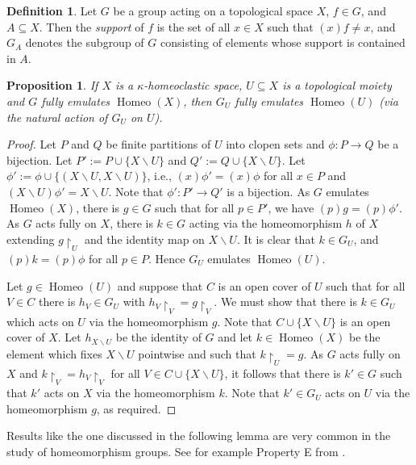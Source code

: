 \documentclass[11pt]{amsart}
\newtheorem{proposition}[theorem]{Proposition}
\theoremstyle{definition}
\newtheorem{definition}[theorem]{Definition}
\newcommand{\Homeo}{\operatorname{Homeo}}
\begin{document}
\begin{definition}\label{def:supdef}
    Let \(G\) be a group acting on a topological space \(X\), $f\in G$, and \(A\subseteq X\). Then the {\em support} of $f$ is the set of all $x\in X$ such that $(x)f\neq x$, and 
    $G_A$ denotes the subgroup of $G$ consisting of elements whose support is contained in \(A\). 
\end{definition}
\begin{proposition}\label{marvelous-stabilisers}
    If \(X\) is a \(\kappa\)-homeoclastic space, \(U\subseteq X\) is a topological moiety and \(G\) fully emulates \(\Homeo(X)\), then \(G_U\) fully emulates \(\Homeo(U)\) (via the natural action of \(G_U\) on \(U\)).
\end{proposition}
    \begin{proof}
        Let \(P\) and \(Q\) be finite partitions of \(U\) into clopen sets and \(\phi:P\to Q\) be a bijection.
        Let \(P':=P\cup \{X\backslash U\}\) and \(Q':=Q\cup \{X\backslash U\}\). Let \(\phi':=\phi \cup \{(X\backslash U,X\backslash U)\} \), i.e., $(x)\phi'=(x)\phi$ for all $x\in P$ and $(X\backslash U)\phi'=X\backslash U$.
        Note that \(\phi':P'\to Q'\) is a bijection.
As \(G\) emulates \(\Homeo(X)\), there is \(g\in G\) such that for all \(p\in P'\), we have \((p)g=(p)\phi'\).
As \(G\) acts fully on \(X\), there is \(k\in G\) acting via the homeomorphism \(h\) of \(X\) extending \(g{\restriction}_U\) and the identity map on \(X\backslash U\). It is clear that \(k\in G_U\), and $(p)k=(p)\phi$ for all $p\in P$. Hence $G_U$ emulates $\Homeo(U)$.

Let \(g\in \Homeo(U)\) and suppose that \(C\) is an open cover of \(U\) such that for all \(V\in C\) there is \(h_V\in G_U\) with \(h_V{\restriction}_V=g{\restriction}_V\).
We must show that there is \(k\in G_U\) which acts on \(U\) via the homeomorphism \(g\).
Note that \(C\cup \{X\backslash U\}\) is an open cover of \(X\). 
Let \(h_{X\backslash U}\) be the identity of \(G\) and
let \(k\in \Homeo(X)\) be the element which fixes \(X\backslash U\) pointwise and such that \(k{\restriction}_U=g\).
As \(G\) acts fully on \(X\) and \(k{\restriction}_{V}=h_V{\restriction}_{V}\) for all \(V\in C\cup \{X\backslash U\} \), it follows that there is \(k'\in G\) such that \(k'\) acts on \(X\) via the homeomorphism \(k\). 
Note that \(k'\in G_U\) acts on \(U\) via the homeomorphism \(g\), as required.
\end{proof}



Results like the one discussed in the following lemma are very common in the study of homeomorphism groups.
See for example Property E from \cite{GV}.
\end{document}
